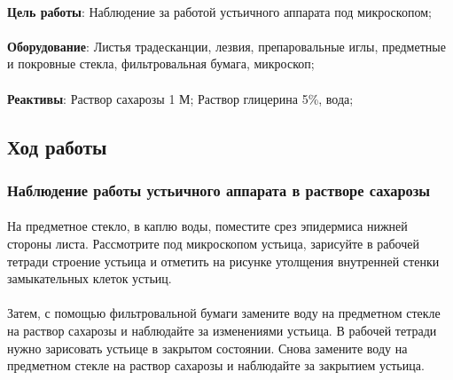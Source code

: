 \begin{footnotesize}

\paragraph*{}\textbf{Цель работы}: Наблюдение за работой устьичного аппарата под микроскопом;

\paragraph*{}\textbf{Оборудование}: Листья традесканции, лезвия, препаровальные иглы, предметные и покровные стекла, фильтровальная бумага, микроскоп;

\paragraph*{}\textbf{Реактивы}: Раствор сахарозы 1 М; Раствор глицерина 5\%, вода;

\end{footnotesize}

\subsection*{Ход работы}

\subsubsection*{Наблюдение работы устьичного аппарата в растворе сахарозы}

\paragraph*{}На предметное стекло, в каплю воды, поместите срез эпидермиса нижней стороны листа. Рассмотрите под микроскопом устьица, зарисуйте в рабочей тетради строение устьица и отметить на рисунке утолщения внутренней стенки замыкательных клеток устьиц. 

\paragraph*{}Затем, с помощью фильтровальной бумаги замените воду на предметном стекле на раствор сахарозы и наблюдайте за изменениями устьица. В рабочей тетради нужно зарисовать устьице в закрытом состоянии. Снова замените воду на предметном стекле на раствор сахарозы и наблюдайте за закрытием устьица.

